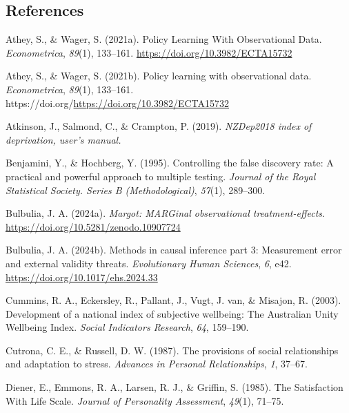 \documentclass[
  single column]{article}
\newlength{\cslhangindent}
\newenvironment{CSLReferences}[2] %
 {\begin{list}{}{%
  \setlength{\itemindent}{0pt}
  \setlength{\leftmargin}{0pt}
  \setlength{\parsep}{0pt}
  \ifodd #1
   \setlength{\leftmargin}{\cslhangindent}
   \setlength{\itemindent}{-1\cslhangindent}
  \fi
  \setlength{\itemsep}{#2\baselineskip}}}
 {\end{list}}
\begin{document}
\newpage{}

\subsection*{References}\label{references}

\label{refs}
\begin{CSLReferences}{1}{0}
Athey, S., \& Wager, S. (2021a). Policy Learning With Observational
Data. \emph{Econometrica}, \emph{89}(1), 133--161.
\url{https://doi.org/10.3982/ECTA15732}

Athey, S., \& Wager, S. (2021b). Policy learning with observational
data. \emph{Econometrica}, \emph{89}(1), 133--161.
https://doi.org/\url{https://doi.org/10.3982/ECTA15732}

Atkinson, J., Salmond, C., \& Crampton, P. (2019). \emph{NZDep2018 index
of deprivation, user{'}s manual.}

Benjamini, Y., \& Hochberg, Y. (1995). Controlling the false discovery
rate: A practical and powerful approach to multiple testing.
\emph{Journal of the Royal Statistical Society. Series B
(Methodological)}, \emph{57}(1), 289--300.

Bulbulia, J. A. (2024a). \emph{Margot: MARGinal observational
treatment-effects}. \url{https://doi.org/10.5281/zenodo.10907724}

Bulbulia, J. A. (2024b). Methods in causal inference part 3: Measurement
error and external validity threats. \emph{Evolutionary Human Sciences},
\emph{6}, e42. \url{https://doi.org/10.1017/ehs.2024.33}

Cummins, R. A., Eckersley, R., Pallant, J., Vugt, J. van, \& Misajon, R.
(2003). Development of a national index of subjective wellbeing: {The}
{Australian} {Unity} {Wellbeing} {Index}. \emph{Social Indicators
Research}, \emph{64}, 159--190.

Cutrona, C. E., \& Russell, D. W. (1987). The provisions of social
relationships and adaptation to stress. \emph{Advances in Personal
Relationships}, \emph{1}, 37--67.

Diener, E., Emmons, R. A., Larsen, R. J., \& Griffin, S. (1985). The
Satisfaction With Life Scale. \emph{Journal of Personality Assessment},
\emph{49}(1), 71--75.


\end{CSLReferences}
\end{document}
